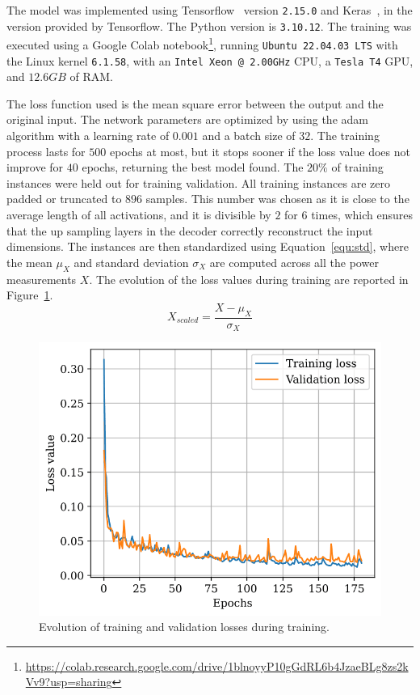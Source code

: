 The model was implemented using Tensorflow~\parencite{abadiTensorFlowLargeScaleMachine2016,tensorflowdevelopersTensorFlow2023} version \texttt{2.15.0} and Keras~\parencite{cholletKeras2015}, in the version provided by Tensorflow. The Python version is \texttt{3.10.12}. The training was executed using a Google Colab notebook\footnote{\url{https://colab.research.google.com/drive/1blnoyyP10gGdRL6b4JzaeBLg8zs2kVv9?usp=sharing}}, running \texttt{Ubuntu 22.04.03 LTS} with the Linux kernel \texttt{6.1.58}, with an \texttt{Intel Xeon @ 2.00GHz} CPU, a \texttt{Tesla T4} GPU, and $12.6GB$ of RAM.

The loss function used is the mean square error between the output and the original input. The network parameters are optimized by using the \acrfull{adam} algorithm with a learning rate of $0.001$ and a batch size of $32$. The training process lasts for $500$ epochs at most, but it stops sooner if the loss value does not improve for $40$ epochs, returning the best model found. The $20\%$ of training instances were held out for training validation. All training instances are zero padded or truncated to $896$ samples. This number was chosen as it is close to the average length of all activations, and it is divisible by $2$ for $6$ times, which ensures that the up sampling layers in the decoder correctly reconstruct the input dimensions. The instances are then standardized using Equation~\eqref{equ:std}, where the mean $\mu_X$ and standard deviation $\sigma_X$ are computed across all the power measurements $X$. The evolution of the loss values during training are reported in Figure~\ref{fig:autoencoder_losses}.
\begin{equation}\label{equ:std}
  X_{scaled} = \frac{X - \mu_X}{\sigma_X}
\end{equation}

\begin{figure}
  \centering
  \includegraphics[width=.6\linewidth]{images/modes_clustering/loss.png}
  \caption{Evolution of training and validation losses during training.}
  \label{fig:autoencoder_losses}
\end{figure}

